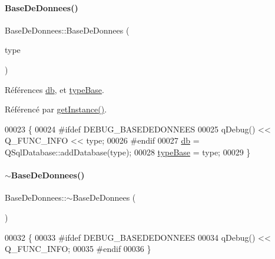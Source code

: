 \paragraph{\texorpdfstring{Base\+De\+Donnees()}{BaseDeDonnees()}}
{\footnotesize\ttfamily Base\+De\+Donnees\+::\+Base\+De\+Donnees (\begin{DoxyParamCaption}\item[{Q\+String}]{type }\end{DoxyParamCaption})\hspace{0.3cm}{\ttfamily [private]}}



Références \hyperlink{class_base_de_donnees_a3e738dcf443370c46a541677ab619f06}{db}, et \hyperlink{class_base_de_donnees_ab682b82167f494496a6531bfe522b42b}{type\+Base}.



Référencé par \hyperlink{class_base_de_donnees_a80028aa2b6b4fbf30fb2e36357b7d3d3}{get\+Instance()}.


\begin{DoxyCode}
00023 \{
00024 \textcolor{preprocessor}{    #ifdef DEBUG\_BASEDEDONNEES}
00025     qDebug() << Q\_FUNC\_INFO << type;
00026 \textcolor{preprocessor}{    #endif}
00027     \hyperlink{class_base_de_donnees_a3e738dcf443370c46a541677ab619f06}{db} = QSqlDatabase::addDatabase(type);
00028     \hyperlink{class_base_de_donnees_ab682b82167f494496a6531bfe522b42b}{typeBase} = type;
00029 \}
\end{DoxyCode}
\mbox{\label{class_base_de_donnees_a5dc474cdbe003644fb0ca7b8f2ec6b93}} 
\paragraph{\texorpdfstring{$\sim$\+Base\+De\+Donnees()}{~BaseDeDonnees()}}
{\footnotesize\ttfamily Base\+De\+Donnees\+::$\sim$\+Base\+De\+Donnees (\begin{DoxyParamCaption}{ }\end{DoxyParamCaption})\hspace{0.3cm}{\ttfamily [private]}}


\begin{DoxyCode}
00032 \{
00033 \textcolor{preprocessor}{    #ifdef DEBUG\_BASEDEDONNEES}
00034     qDebug() << Q\_FUNC\_INFO;
00035 \textcolor{preprocessor}{    #endif}
00036 \}
\end{DoxyCode}


